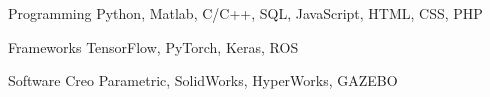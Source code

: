 


\begin{cvskills}


\cvskill
{Programming} %
{Python, Matlab, C/C++, SQL, JavaScript, HTML, CSS, PHP} %


\cvskill
{Frameworks} %
{TensorFlow, PyTorch, Keras, ROS} %


\cvskill
{Software} %
{Creo Parametric, SolidWorks, HyperWorks, GAZEBO} %


\end{cvskills}